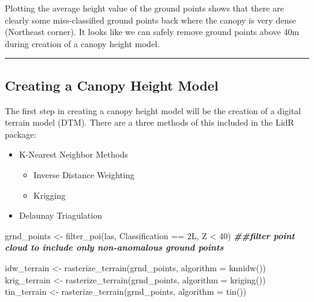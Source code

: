 \documentclass[
]{article}
\newenvironment{Shaded}{\begin{snugshade}}{\end{snugshade}}
\newcommand{\AttributeTok}[1]{\textcolor[rgb]{0.77,0.63,0.00}{#1}}
\newcommand{\DecValTok}[1]{\textcolor[rgb]{0.00,0.00,0.81}{#1}}
\newcommand{\DocumentationTok}[1]{\textcolor[rgb]{0.56,0.35,0.01}{\textbf{\textit{#1}}}}
\newcommand{\FunctionTok}[1]{\textcolor[rgb]{0.00,0.00,0.00}{#1}}
\newcommand{\NormalTok}[1]{#1}
\newcommand{\OtherTok}[1]{\textcolor[rgb]{0.56,0.35,0.01}{#1}}
\newcommand{\SpecialCharTok}[1]{\textcolor[rgb]{0.00,0.00,0.00}{#1}}
\begin{document}
Plotting the average height value of the ground points shows that there
are clearly some miss-classified ground points back where the canopy is
very dense (Northeast corner). It looks like we can safely remove ground
points above 40m during creation of a canopy height model.

\begin{center}\rule{0.5\linewidth}{0.5pt}\end{center}

\hypertarget{creating-a-canopy-height-model}{%
\subsection{Creating a Canopy Height
Model}\label{creating-a-canopy-height-model}}

The first step in creating a canopy height model will be the creation of
a digital terrain model (DTM). There are a three methods of this
included in the LidR package:

\begin{itemize}
\item
  K-Nearest Neighbor Methods

  \begin{itemize}
  \item
    Inverse Distance Weighting
  \item
    Krigging
  \end{itemize}
\item
  Delaunay Triagulation
\end{itemize}

\begin{Shaded}
\begin{Highlighting}[]
\NormalTok{grnd\_points }\OtherTok{\textless{}{-}} \FunctionTok{filter\_poi}\NormalTok{(las, Classification }\SpecialCharTok{==}\NormalTok{ 2L, Z }\SpecialCharTok{\textless{}} \DecValTok{40}\NormalTok{) }\DocumentationTok{\#\#filter point cloud to include only non{-}anomalous ground points}

\NormalTok{idw\_terrain }\OtherTok{\textless{}{-}} \FunctionTok{rasterize\_terrain}\NormalTok{(grnd\_points, }\AttributeTok{algorithm =} \FunctionTok{knnidw}\NormalTok{())}
\NormalTok{krig\_terrain }\OtherTok{\textless{}{-}} \FunctionTok{rasterize\_terrain}\NormalTok{(grnd\_points, }\AttributeTok{algorithm =} \FunctionTok{kriging}\NormalTok{())}
\NormalTok{tin\_terrain }\OtherTok{\textless{}{-}} \FunctionTok{rasterize\_terrain}\NormalTok{(grnd\_points, }\AttributeTok{algorithm =} \FunctionTok{tin}\NormalTok{())}
\end{Highlighting}
\end{Shaded}
\end{document}
